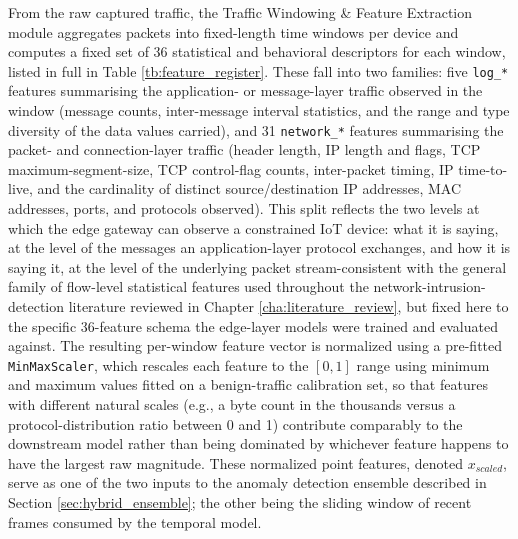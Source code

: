 From the raw captured traffic, the Traffic Windowing \& Feature Extraction module aggregates packets into fixed-length time windows per device and computes a fixed set of 36 statistical and behavioral descriptors for each window, listed in full in Table \ref{tb:feature_register}. These fall into two families: five \texttt{log\_*} features summarising the application- or message-layer traffic observed in the window (message counts, inter-message interval statistics, and the range and type diversity of the data values carried), and 31 \texttt{network\_*} features summarising the packet- and connection-layer traffic (header length, IP length and flags, TCP maximum-segment-size, TCP control-flag counts, inter-packet timing, IP time-to-live, and the cardinality of distinct source/destination IP addresses, MAC addresses, ports, and protocols observed). This split reflects the two levels at which the edge gateway can observe a constrained IoT device: what it is saying, at the level of the messages an application-layer protocol exchanges, and how it is saying it, at the level of the underlying packet stream-consistent with the general family of flow-level statistical features used throughout the network-intrusion-detection literature reviewed in Chapter \ref{cha:literature_review}, but fixed here to the specific 36-feature schema the edge-layer models were trained and evaluated against. The resulting per-window feature vector is normalized using a pre-fitted \texttt{MinMaxScaler}, which rescales each feature to the $[0,1]$ range using minimum and maximum values fitted on a benign-traffic calibration set, so that features with different natural scales (e.g., a byte count in the thousands versus a protocol-distribution ratio between 0 and 1) contribute comparably to the downstream model rather than being dominated by whichever feature happens to have the largest raw magnitude. These normalized point features, denoted $x_{scaled}$, serve as one of the two inputs to the anomaly detection ensemble described in Section \ref{sec:hybrid_ensemble}; the other being the sliding window of recent frames consumed by the temporal model.
